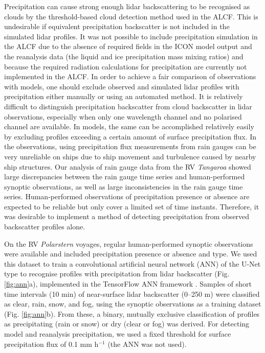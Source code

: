 \documentclass[12pt,a4paper]{article}
\begin{document}
Precipitation can cause strong enough lidar backscattering to be recognised as
clouds by the threshold-based cloud detection method used in the ALCF. This is
undesirable if equivalent precipitation backscatter is not included in the
simulated lidar profiles. It was not possible to include precipitation
simulation in the ALCF due to the absence of required fields in the ICON model
output and the reanalysis data (the liquid and ice precipitation mass mixing
ratios) and because the required radiation calculations for precipitation are
currently not implemented in the ALCF. In order to achieve a fair comparison of
observations with models, one should exclude observed and simulated lidar
profiles with precipitation either manually or using an automated method. It is
relatively difficult to distinguish precipitation backscatter from cloud
backscatter in lidar observations, especially when only one wavelength channel
and no polarised channel are available. In models, the same can be accomplished
relatively easily by excluding profiles exceeding a certain amount of surface
precipitation flux. In the observations, using precipitation flux measurements
from rain gauges can be very unreliable on ships due to ship movement and
turbulence caused by nearby ship structures. Our analysis of rain gauge data
from the RV \emph{Tangaroa} showed large discrepancies between the rain gauge
time series and human-performed synoptic observations, as well as large
inconsistencies in the rain gauge time series. Human-performed observations of
precipitation presence or absence are expected to be reliable but only cover a
limited set of time instants. Therefore, it was desirable to implement a method
of detecting precipitation from observed backscatter profiles alone.

On the RV \emph{Polarstern} voyages, regular human-performed synoptic
observations were available and included precipitation presence or absence and
type. We used this dataset to train a convolutional artificial neural network
(ANN) of the U-Net type \citep{ronneberger2015} to recognise profiles with
precipitation from lidar backscatter (Fig. \ref{fig:ann}a), implemented in the
TensorFlow ANN framework \citep{tensorflow}. Samples of short time intervals
(10 min) of near-surface lidar backscatter (0–250 m) were classified as clear,
rain, snow, and fog, using the synoptic observations as a training dataset
(Fig.  \ref{fig:ann}b). From these, a binary, mutually exclusive classification
of profiles as precipitating (rain or snow) or dry (clear or fog) was derived.
For detecting model and reanalysis precipitation, we used a fixed threshold for
surface precipitation flux of 0.1 mm h$^{-1}$ (the ANN was not used).
\end{document}
